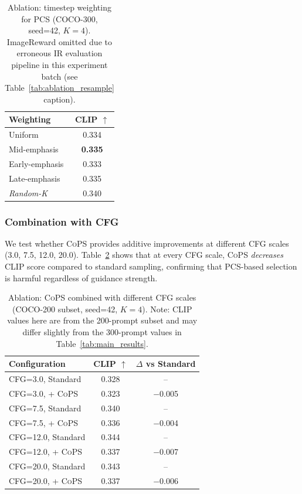 \documentclass{article}
\newcommand{\cops}{\textsc{CoPS}}
\newcommand{\pcs}{\textsc{PCS}}
\begin{document}
\begin{table}[t]
\centering
\caption{Ablation: timestep weighting for \pcs{} (COCO-300, seed=42, $K=4$). ImageReward omitted due to erroneous IR evaluation pipeline in this experiment batch (see Table~\ref{tab:ablation_resample} caption).}
\label{tab:ablation_weights}
\small
\begin{tabular}{lc}
\toprule
Weighting & CLIP $\uparrow$ \\
\midrule
Uniform & 0.334 \\
Mid-emphasis & \textbf{0.335} \\
Early-emphasis & 0.333 \\
Late-emphasis & 0.335 \\
\midrule
\textit{Random-K} & 0.340 \\
\bottomrule
\end{tabular}
\end{table}

\subsubsection{Combination with CFG}

We test whether \cops{} provides additive improvements at different CFG scales (3.0, 7.5, 12.0, 20.0). Table~\ref{tab:ablation_cfg} shows that at every CFG scale, \cops{} \emph{decreases} CLIP score compared to standard sampling, confirming that \pcs{}-based selection is harmful regardless of guidance strength.

\begin{table}[t]
\centering
\caption{Ablation: \cops{} combined with different CFG scales (COCO-200 subset, seed=42, $K=4$). Note: CLIP values here are from the 200-prompt subset and may differ slightly from the 300-prompt values in Table~\ref{tab:main_results}.}
\label{tab:ablation_cfg}
\small
\begin{tabular}{lcc}
\toprule
Configuration & CLIP $\uparrow$ & $\Delta$ vs Standard \\
\midrule
CFG=3.0, Standard & 0.328 & -- \\
CFG=3.0, + \cops{} & 0.323 & $-$0.005 \\
\midrule
CFG=7.5, Standard & 0.340 & -- \\
CFG=7.5, + \cops{} & 0.336 & $-$0.004 \\
\midrule
CFG=12.0, Standard & 0.344 & -- \\
CFG=12.0, + \cops{} & 0.337 & $-$0.007 \\
\midrule
CFG=20.0, Standard & 0.343 & -- \\
CFG=20.0, + \cops{} & 0.337 & $-$0.006 \\
\bottomrule
\end{tabular}
\end{table}
\end{document}
